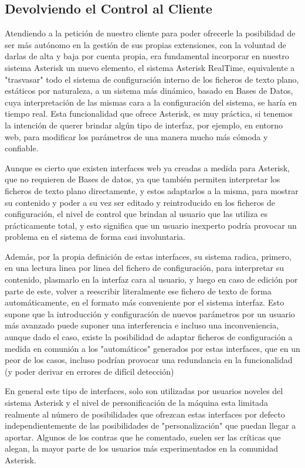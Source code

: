 {\subsection{Devolviendo el Control al Cliente}

Atendiendo a la petición de nuestro cliente para poder ofrecerle la posibilidad de ser más autónomo en la gestión de sus propias extensiones, con la voluntad de darlas de alta y baja por cuenta propia, era fundamental incorporar en nuestro sistema Asterisk un nuevo elemento, el sistema Asterisk RealTime, equivalente a "trasvasar" todo el sistema de configuración interno de los ficheros de texto plano, estáticos por naturaleza, a un sistema más dinámico, basado en Bases de Datos, cuya interpretación de las mismas cara a la configuración del sistema, se haría en tiempo real. Esta funcionalidad que ofrece Asterisk, es muy práctica, si tenemos la intención de querer brindar algún tipo de interfaz, por ejemplo, en entorno web, para modificar los parámetros de una manera mucho más cómoda y confiable.

Aunque es cierto que existen interfaces web ya creadas a medida para Asterisk, que no requieren de Bases de datos, ya que también permiten interpretar los ficheros de texto plano directamente, y estos adaptarlos a la misma, para mostrar su contenido y poder a su vez ser editado y reintroducido en los ficheros de configuración, el nivel de control que brindan al usuario que las utiliza es prácticamente total, y esto significa que un usuario inexperto podría provocar un problema en el sistema de forma casi involuntaria. 

Además, por la propia definición de estas interfaces, su sistema radica, primero, en una lectura linea por linea del fichero de configuración, para interpretar su contenido, plasmarlo en la interfaz cara al usuario, y luego en caso de edición por parte de este, volver a reescribir literalmente ese fichero de texto de forma automáticamente, en el formato más conveniente por el sistema interfaz. Esto supone que la introducción y configuración de nuevos parámetros por un usuario más avanzado puede suponer una interferencia e incluso una inconveniencia, aunque dado el caso, existe la posibilidad de adaptar ficheros de configuración a medida en comunión a los "automáticos" generados por estas interfaces, que en un peor de los casos, incluso podrían provocar una redundancia en la funcionalidad (y poder derivar en errores de difícil detección)

En general este tipo de interfaces, solo son utilizadas por usuarios noveles del sistema Asterisk y el nivel de personificación de la máquina esta limitada realmente al número de posibilidades que ofrezcan estas interfaces por defecto independientemente de las posibilidades de "personalización" que puedan llegar a aportar. Algunos de los contras que he comentado, suelen ser las críticas que alegan, la mayor parte de los usuarios más experimentados en la comunidad Asterisk.

}
